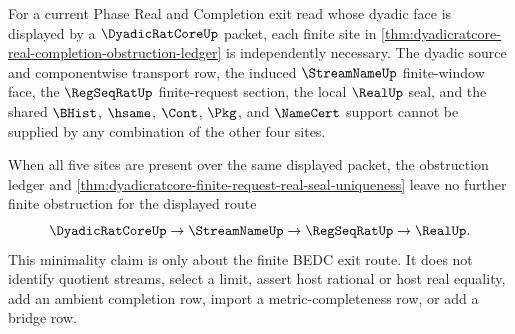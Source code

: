 \begin{theorem}
\label{thm:dyadicratcore-finite-tail-obstruction-minimality}
For a current Phase Real and Completion exit read whose dyadic face is displayed by a $\DyadicRatCoreUp$ packet, each finite site in \autoref{thm:dyadicratcore-real-completion-obstruction-ledger} is independently necessary. The dyadic source and componentwise transport row, the induced $\StreamNameUp$ finite-window face, the $\RegSeqRatUp$ finite-request section, the local $\RealUp$ seal, and the shared $\BHist$, $\hsame$, $\Cont$, $\Pkg$, and $\NameCert$ support cannot be supplied by any combination of the other four sites.

When all five sites are present over the same displayed packet, the obstruction ledger and \autoref{thm:dyadicratcore-finite-request-real-seal-uniqueness} leave no further finite obstruction for the displayed route
$$
\DyadicRatCoreUp \to \StreamNameUp \to \RegSeqRatUp \to \RealUp.
$$
This minimality claim is only about the finite BEDC exit route. It does not identify quotient streams, select a limit, assert host rational or host real equality, add an ambient completion row, import a metric-completeness row, or add a bridge row.
\end{theorem}
